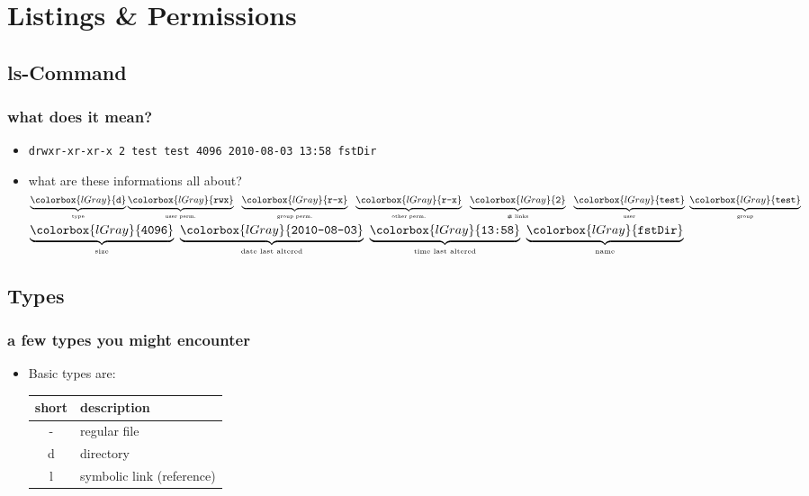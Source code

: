 \documentclass[handout]{beamer}
\newcommand{\code}[1]{\colorbox{lGray}{\texttt{#1}}}
\begin{document}
\section{Listings \& Permissions}
    \subsection{ls-Command}
       \begin{frame}[fragile]
			\frametitle{what does it mean?}
			\begin{itemize}
                \item<1-> \code{drwxr-xr-xr-x 2 test test 4096 2010-08-03 13:58 fstDir}
				\item<2-> what are these informations all about?\\
                $\underbrace{\code{d}}_{\text{\tiny{type}}}
                \underbrace{\code{rwx}}_{\text{\tiny{user perm.}}}\ \ 
                \underbrace{\code{r-x}}_{\text{\tiny{group perm.}}}\ \ 
                \underbrace{\code{r-x}}_{\text{\tiny{other perm.}}}\ \
                \underbrace{\code{2}}_{\text{\tiny{\# links}}}\ \ 
                \underbrace{\code{test}}_{\text{\tiny{user}}}\ 
                \underbrace{\code{test}}_{\text{\tiny{group}}}$ \\
                $\underbrace{\code{4096}}_{\text{\tiny{size}}}\ 
                \underbrace{\code{2010-08-03}}_{\text{\tiny{date last altered}}}\ 
                \underbrace{\code{13:58}}_{\text{\tiny{time last altered}}}\ 
                \underbrace{\code{fstDir}}_{\text{\tiny{name}}}$
            \end{itemize}
		\end{frame}
    \subsection{Types}
        \begin{frame}
			\frametitle{a few types you might encounter}
			\begin{itemize}
                \item<1-> Basic types are: \\
                \begin{tabular}{cl}
                    short & description \\ \hline
                    - & regular file \\
                    d & directory \\
                    l & symbolic link (reference)
                \end{tabular}
            \end{itemize}
		\end{frame}
\end{document}
